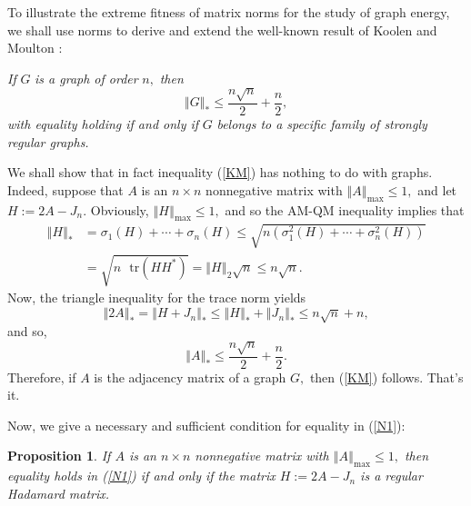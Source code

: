 \documentclass[12pt]{article}%
\newtheorem{proposition}[theorem]{Proposition}
\begin{document}
To illustrate the extreme fitness of matrix norms for the study of graph
energy, we shall use norms to derive and extend the well-known result of
Koolen and Moulton \cite{KoMo01}:\medskip

\emph{If }$G$\emph{ is a graph of order }$n,$\emph{ then }%
\begin{equation}
\left\Vert G\right\Vert _{\ast}\leq\frac{n\sqrt{n}}{2}+\frac{n}{2}, \label{KM}%
\end{equation}
\emph{with equality holding if and only if }$G$\emph{ belongs to a specific
family of strongly regular graphs.}\medskip

We shall show that in fact inequality (\ref{KM}) has nothing to do with
graphs. Indeed, suppose that $A$ is an $n\times n$ nonnegative matrix with
$\left\Vert A\right\Vert _{\max}\leq1,$ and let $H:=2A-J_{n}.$ Obviously,
$\left\Vert H\right\Vert _{\max}\leq1,$ and so the AM-QM inequality implies
that
\begin{align}
\left\Vert H\right\Vert _{\ast}  &  =\sigma_{1}\left(  H\right)
+\cdots+\sigma_{n}\left(  H\right)  \leq\sqrt{n\left(  \sigma_{1}^{2}\left(
H\right)  +\cdots+\sigma_{n}^{2}\left(  H\right)  \right)  }\label{in2}\\
&  =\sqrt{n\text{ }\mathrm{tr}\left(  HH^{\ast}\right)  }=\left\Vert
H\right\Vert _{2}\sqrt{n}\leq n\sqrt{n}. \label{in2.1}%
\end{align}
Now, the triangle inequality for the trace norm yields
\[
\left\Vert 2A\right\Vert _{\ast}=\left\Vert H+J_{n}\right\Vert _{\ast}%
\leq\left\Vert H\right\Vert _{\ast}+\left\Vert J_{n}\right\Vert _{\ast}\leq
n\sqrt{n}+n,
\]
and so,%
\begin{equation}
\left\Vert A\right\Vert _{\ast}\leq\frac{n\sqrt{n}}{2}+\frac{n}{2}. \label{N1}%
\end{equation}
Therefore, if $A$ is the adjacency matrix of a graph $G,$ then (\ref{KM})
follows. That's it.\medskip

Now, we give a necessary and sufficient condition for equality in (\ref{N1}):

\begin{proposition}
\label{proKM}If $A$ is an $n\times n$ nonnegative matrix with $\left\Vert
A\right\Vert _{\max}\leq1,$ then equality holds in (\ref{N1}) if and only if
the matrix $H:=2A-J_{n}$ is a regular Hadamard matrix.
\end{proposition}
\end{document}
